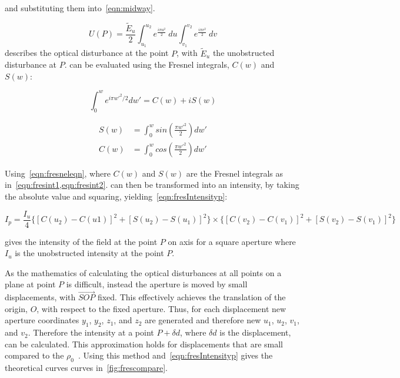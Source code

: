 and substituting them into~\cref{eqn:midway}.

\begin{equation}
U(P)=\frac{\tilde{E}_u}{2}\int_{u_1}^{u_2} e^{\tfrac{i\pi u^2}{2}}\ du\int_{v_1}^{v_2} e^{\tfrac{i\pi v^2}{2}} \ dv
\label{eqn:pentdisturb}
\end{equation}
 describes the optical disturbance at the point $P$, with $\tilde{E}_u$ the unobstructed disturbance at $P$.
 can be evaluated using the Fresnel integrals, $C(w)$ and $S(w)$:


\begin{equation}
\int_{0}^{w}e^{i\pi w'^2/2}dw'=C(w)+iS(w)
\label{eqn:fresneleqn}
\end{equation}


\begin{align}
S(w)&=\int^w_0 sin\left(\frac{\pi w'^2}{2}\right)dw'\label{eqn:fresint1}\\
C(w)&=\int^w_0 cos\left(\frac{\pi w'^2}{2}\right)dw'\label{eqn:fresint2}
\end{align}


Using~\cref{eqn:fresneleqn}, where $C(w)$ and $S(w)$ are the Fresnel integrals as in~\cref{eqn:fresint1,eqn:fresint2}.
 can then be transformed into an intensity, by taking the absolute value and squaring, yielding~\cref{eqn:fresIntensityp}:


\begin{equation}
I_p = \frac{I_u}{4} \{[C(u_2) - C(u1)]^2 + [S(u_2) - S(u_1)]^2\} \times \{[C(v_2) - C(v_1)]^2 + [S(v_2) - S(v_1)]^2\}
\label{eqn:fresIntensityp}
\end{equation}

 gives the intensity of the field at the point $P$ on axis for a square aperture where $I_u$ is the unobstructed intensity at the point $P$. 

\medskip

As the mathematics of calculating the optical disturbances at all points on a plane at point $P$ is difficult, instead the aperture is moved by small displacements, with $\overrightarrow{SOP}$ fixed.
This effectively achieves the translation of the origin, $O$, with respect to the fixed aperture. 
Thus, for each displacement new aperture coordinates $y_1$, $y_2$, $z_1$, and $z_2$ are generated and therefore new $u_1$, $u_2$, $v_1$, and $v_2$.
Therefore the intensity at a point $P +\delta d$, where $\delta d$ is the displacement, can be calculated.
This approximation holds for displacements that are small compared to the $\rho_0$~\cite{born2000principles,hecht2017optics,goodman2017introduction}.
Using this method and~\cref{eqn:fresIntensityp} gives the theoretical curves curves in~\cref{fig:frescompare}.

